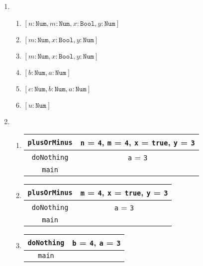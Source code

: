 \documentclass[12pt]{article}
\begin{document}
\begin{enumerate}[label=\alph*)]
  \item
    \begin{enumerate}[label=\arabic*)]
      \item $[n : \texttt{Num}, m : \texttt{Num}, x : \texttt{Bool}, y : \texttt{Num}]$
      \item $[m : \texttt{Num}, x : \texttt{Bool}, y : \texttt{Num}]$
      \item $[m : \texttt{Num}, x : \texttt{Bool}, y : \texttt{Num}]$
      \item $[b : \texttt{Num}, a : \texttt{Num}]$
      \item $[c : \texttt{Num}, b : \texttt{Num}, a : \texttt{Num}]$
      \item $[u : \texttt{Num}]$
    \end{enumerate}

  \bigskip

  \item
    \begin{enumerate}[label=\arabic*)]
      \item
        \begin{tabular}{| c | c |}
          \hline
          \texttt{plusOrMinus} &
            \texttt{n} = \texttt{4},
            \texttt{m} = \texttt{4},
            \texttt{x} = \texttt{true},
            \texttt{y} = \texttt{3}\\
          \hline
          \texttt{doNothing} & \texttt{a} = \texttt{3}\\
          \hline
          \texttt{main} &\\
          \hline
        \end{tabular}

      \setcounter{enumii}{2}
      \item
        \begin{tabular}{| c | c |}
          \hline
          \texttt{plusOrMinus} &
            \texttt{m} = \texttt{4},
            \texttt{x} = \texttt{true},
            \texttt{y} = \texttt{3}\\
          \hline
          \texttt{doNothing} & \texttt{a} = \texttt{3}\\
          \hline
          \texttt{main} &\\
          \hline
        \end{tabular}

      \item
        \begin{tabular}{| c | c |}
          \hline
          \texttt{doNothing} &
            \texttt{b} = \texttt{4},
            \texttt{a} = \texttt{3}\\
          \hline
          \texttt{main} &\\
          \hline
        \end{tabular}


\end{enumerate}
\end{enumerate}
\end{document}
